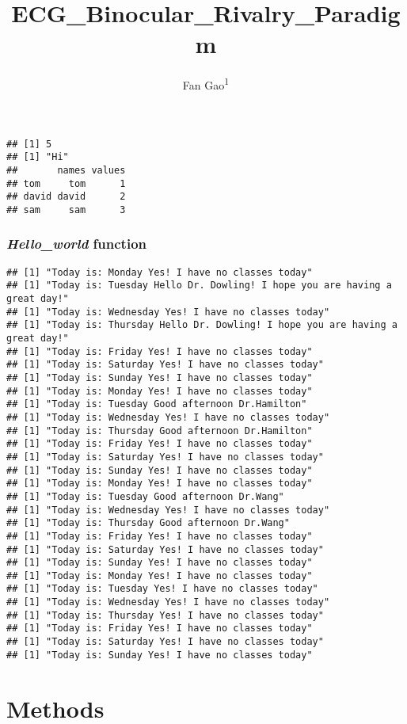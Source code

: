 \documentclass[
  man]{apa6}
\title{ECG\_Binocular\_Rivalry\_Paradigm}
\author{Fan Gao\textsuperscript{1}}
\date{}
\affiliation{\vspace{0.5cm}\textsuperscript{1} University of Chicago}
\begin{document}
\maketitle

\begin{verbatim}
## [1] 5
## [1] "Hi"
##       names values
## tom     tom      1
## david david      2
## sam     sam      3
\end{verbatim}

\hypertarget{hello_world-function}{%
\subsubsection{\texorpdfstring{\emph{Hello\_world} function}{Hello\_world function}}\label{hello_world-function}}

\begin{verbatim}
## [1] "Today is: Monday Yes! I have no classes today"
## [1] "Today is: Tuesday Hello Dr. Dowling! I hope you are having a great day!"
## [1] "Today is: Wednesday Yes! I have no classes today"
## [1] "Today is: Thursday Hello Dr. Dowling! I hope you are having a great day!"
## [1] "Today is: Friday Yes! I have no classes today"
## [1] "Today is: Saturday Yes! I have no classes today"
## [1] "Today is: Sunday Yes! I have no classes today"
## [1] "Today is: Monday Yes! I have no classes today"
## [1] "Today is: Tuesday Good afternoon Dr.Hamilton"
## [1] "Today is: Wednesday Yes! I have no classes today"
## [1] "Today is: Thursday Good afternoon Dr.Hamilton"
## [1] "Today is: Friday Yes! I have no classes today"
## [1] "Today is: Saturday Yes! I have no classes today"
## [1] "Today is: Sunday Yes! I have no classes today"
## [1] "Today is: Monday Yes! I have no classes today"
## [1] "Today is: Tuesday Good afternoon Dr.Wang"
## [1] "Today is: Wednesday Yes! I have no classes today"
## [1] "Today is: Thursday Good afternoon Dr.Wang"
## [1] "Today is: Friday Yes! I have no classes today"
## [1] "Today is: Saturday Yes! I have no classes today"
## [1] "Today is: Sunday Yes! I have no classes today"
## [1] "Today is: Monday Yes! I have no classes today"
## [1] "Today is: Tuesday Yes! I have no classes today"
## [1] "Today is: Wednesday Yes! I have no classes today"
## [1] "Today is: Thursday Yes! I have no classes today"
## [1] "Today is: Friday Yes! I have no classes today"
## [1] "Today is: Saturday Yes! I have no classes today"
## [1] "Today is: Sunday Yes! I have no classes today"
\end{verbatim}

\hypertarget{methods}{%
\section{Methods}\label{methods}}
\end{document}

